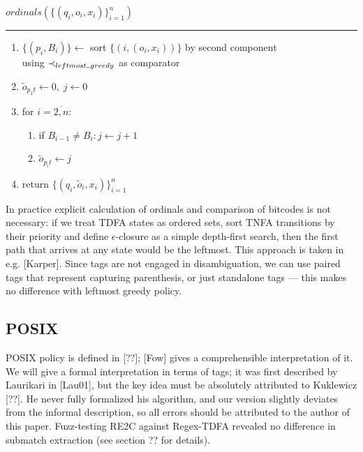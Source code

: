 \documentclass{article}
\newcommand{\Xset}{\!\leftarrow\!}
\newcommand{\Xund}{\rule{.4em}{.4pt}} %
\newcommand{\Xeq}{\!=\!}
\theoremstyle{definition}
\begin{document}
\begin{multicols}{2}
    $ordinals (\{(q_i, o_i, x_i)\}_{i=1}^n)$
    \hrule
    \begin{enumerate}[leftmargin=0in]
    \smallskip
        \item[] $\{(p_i, B_i)\} \Xset $ sort $\{(i, (o_i, x_i))\}$ by second component \\
             using $\prec_{leftmost \Xund greedy}$ as comparator
        \item[] $\widetilde{o}_{p_1 t} \Xset 0, \; j \Xset 0$
        \item[] for $i \Xeq \overline{2, n}$:
        \begin{enumerate}
            \item[] if $B_{i-1} \!\neq\! B_i: j \Xset j \!+\! 1$
            \item[] $\widetilde{o}_{p_i t} \Xset j$
        \end{enumerate}
        \item[] return $\{(q_i, \widetilde{o}_i, x_i)\}_{i=1}^n$
        \\
    \end{enumerate}

    \bigskip

In practice explicit calculation of ordinals and comparison of bitcodes is not necessary:
if we treat TDFA states as ordered sets,
sort TNFA transitions by their priority
and define $\epsilon$-closure as a simple depth-first search,
then the first path that arrives at any state would be the leftmost.
This approach is taken in e.g. [Karper].
Since tags are not engaged in disambiguation,
we can use paired tags that represent capturing parenthesis, or just standalone tags --- this makes no difference with leftmost greedy policy.

\subsection{POSIX}

POSIX policy is defined in [??]; [Fow] gives a comprehensible interpretation of it.
We will give a formal interpretation in terms of tags;
it was first described by Laurikari in [Lau01], but the key idea must be absolutely attributed to Kuklewicz [??].
He never fully formalized his algorithm, and our version slightly deviates from the informal description,
so all errors should be attributed to the author of this paper.
Fuzz-testing RE2C against Regex-TDFA revealed no difference in submatch extraction
(see section ?? for details).
\\


\end{multicols}
\end{document}
